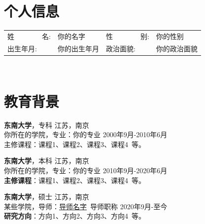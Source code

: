 \documentclass[11pt]{article}
\begin{document}
    \begin{minipage}[b]{0.78\textwidth}
        \section{\makebox[\widthof{\faAddressCard}][c]{\color{primary_color}{\faAddressCard}}\quad 个人信息}
        \begin{tabularx}{\linewidth}{p{}Xp{}X}
            姓\ \ \ \ \ \ \ \ 名: & 你的名字 & 
            性\ \ \ \ \ \ \ \ 别: & 你的性别 \\
            出生年月: & 你的出生年月 & 
            政治面貌: & 你的政治面貌 \\
        \end{tabularx} \ %

        \section{\makebox[\widthof{\faGraduationCap}][c]{\color{primary_color}{\faGraduationCap}}\quad 教育背景}
        
        {\large \textbf{东南大学}}，专科 \hfill {江苏，南京} \\
        {{你所在的学院}}，专业：你的专业 \hfill {2000年9月-2010年6月} \\
        {主修课程}：课程1、课程2、课程3、课程4\ 等。
        
        \vspace{0.5em}
        {\large \textbf{东南大学}}，本科 \hfill {江苏，南京} \\
        {{你所在的学院}}，专业：你的专业 \hfill {2010年9月-2020年6月} \\
        \textbf{主修课程}：课程1、课程2、课程3、课程4\ 等。
        
        \vspace{0.5em}
        {\large \textbf{东南大学}}，硕士 \hfill {江苏，南京} \\
        {{某些学院}}，导师：\href{导师的个人主页.site}{导师名字}\ 导师职称 \hfill {2020年9月-至今} \\
        \textbf{研究方向}：方向1、方向2、方向3、方向4\ 等。
    \end{minipage}  \ %
\end{document}
